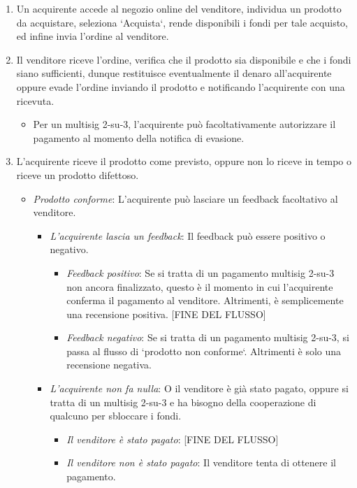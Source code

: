 \begin{enumerate}
    \item Un acquirente accede al negozio online del venditore, individua un prodotto da acquistare, seleziona `Acquista`, rende disponibili i fondi per tale acquisto, ed infine invia l'ordine al venditore.
    \item Il venditore riceve l'ordine, verifica che il prodotto sia disponibile e che i fondi siano sufficienti, dunque restituisce eventualmente il denaro all'acquirente oppure evade l'ordine inviando il prodotto e notificando l'acquirente con una ricevuta.
    \begin{itemize}
        \item Per un multisig 2-su-3, l'acquirente può facoltativamente autorizzare il pagamento al momento della notifica di evasione.
    \end{itemize}{}
    \item L'acquirente riceve il prodotto come previsto, oppure non lo riceve in tempo o riceve un prodotto difettoso.
    \begin{itemize}
        \item {\em Prodotto conforme}: L'acquirente può lasciare un feedback facoltativo al venditore.
        \begin{itemize}
            \item {\em L'acquirente lascia un feedback}: Il feedback può essere positivo o negativo.
            \begin{itemize}
                \item {\em Feedback positivo}: Se si tratta di un pagamento multisig 2-su-3 non ancora finalizzato, questo è il momento in cui l'acquirente conferma il pagamento al venditore. Altrimenti, è semplicemente una recensione positiva. [FINE DEL FLUSSO]
                \item {\em Feedback negativo}: Se si tratta di un pagamento multisig 2-su-3, si passa al flusso di `prodotto non conforme`. Altrimenti è solo una recensione negativa.
            \end{itemize}{}
            \item {\em L'acquirente non fa nulla}: O il venditore è già stato pagato, oppure si tratta di un multisig 2-su-3 e ha bisogno della cooperazione di qualcuno per sbloccare i fondi.
            \begin{itemize}
                \item {\em Il venditore è stato pagato}: [FINE DEL FLUSSO]
                \item {\em Il venditore non è stato pagato}: Il venditore tenta di ottenere il pagamento.

\end{itemize}
\end{itemize}
\end{itemize}
\end{enumerate}
